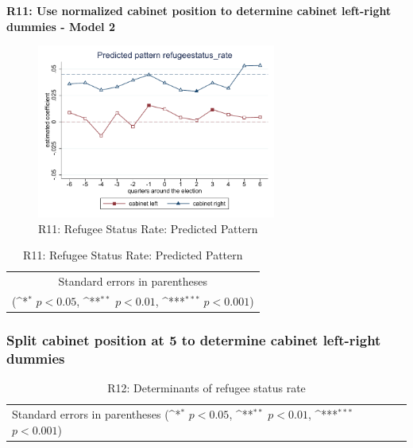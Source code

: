 \documentclass[10pt,a4paper]{scrartcl}
\begin{document}
\clearpage
\textbf{R11: Use normalized cabinet position to determine cabinet left-right dummies - Model 2}
\begin{figure}[!ht]
	\centering
	\includegraphics[width=0.7\textwidth]{figures_edited/refugeestatus_rate_graph2_R11.pdf}
	\caption{R11: Refugee Status Rate: Predicted Pattern}
\end{figure}

\begin{table}[!ht]\centering
	\footnotesize
	\renewcommand{\arraystretch}{1.2}
	\def\sym#1{\ifmmode^{#1}\else\(^{#1}\)\fi}
	\caption{R11: Refugee Status Rate: Predicted Pattern}
	\begin{tabular}{l*{2}{c}}
		\hline\hline
		
		\hline\hline
		\multicolumn{3}{c}{\footnotesize Standard errors in parentheses} \\
		\multicolumn{3}{c}{\footnotesize (\sym{*} \(p<0.05\), \sym{**} \(p<0.01\), \sym{***} \(p<0.001\))} \\
	\end{tabular}
\end{table}





\clearpage
\FloatBarrier
\subsubsection{Split cabinet position at 5 to determine cabinet left-right dummies}
\begin{table}[!ht]\centering
	\renewcommand{\arraystretch}{1.25}
	\small
	\def\sym#1{\ifmmode^{#1}\else\(^{#1}\)\fi}
	\caption{R12: Determinants of refugee status rate}
	\begin{tabular}{l*{3}{c}}
		\hline\hline
		
		\hline\hline
		\multicolumn{4}{l}{\footnotesize Standard errors in parentheses (\sym{*} \(p<0.05\), \sym{**} \(p<0.01\), \sym{***} \(p<0.001\))}\\
	\end{tabular}
\end{table}
\end{document}
